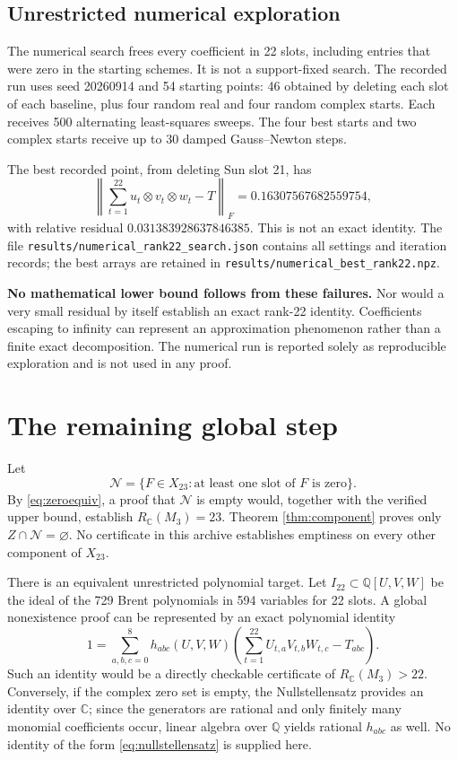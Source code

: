 \documentclass[11pt,letterpaper]{article}
\theoremstyle{definition}\newtheorem{definition}[theorem]{Definition}
\theoremstyle{remark}\newtheorem{remark}[theorem]{Remark}
\newcommand{\CC}{\mathbb C}\newcommand{\ZZ}{\mathbb Z}\newcommand{\QQ}{\mathbb Q}
\newcommand{\file}[1]{\nolinkurl{#1}}
\begin{document}
\subsection{Unrestricted numerical exploration}
The numerical search frees every coefficient in 22 slots, including
entries that were zero in the starting schemes. It is not a support-fixed
search. The recorded run uses seed 20260914 and 54 starting points:
46 obtained by deleting each slot of each baseline, plus four random real
and four random complex starts. Each receives 500 alternating
least-squares sweeps. The four best starts and two complex starts receive
up to 30 damped Gauss--Newton steps.

The best recorded point, from deleting Sun slot 21, has
\[
 \left\|\sum_{t=1}^{22}u_t\otimes v_t\otimes w_t-T\right\|_F
 =0.16307567682559754,
\]
with relative residual $0.031383928637846385$. This is not an exact
identity. The file \file{results/numerical_rank22_search.json} contains
all settings and iteration records; the best arrays are retained in
\file{results/numerical_best_rank22.npz}.

\textbf{No mathematical lower bound follows from these failures.}
Nor would a very small residual by itself establish an exact rank-22
identity. Coefficients escaping to infinity can represent an approximation
phenomenon rather than a finite exact decomposition. The numerical run is
reported solely as reproducible exploration and is not used in any proof.

\section{The remaining global step}
\label{sec:gap}
Let
\[
 \mathcal N=\{F\in X_{23}:\text{at least one slot of }F\text{ is zero}\}.
\]
By \eqref{eq:zeroequiv}, a proof that $\mathcal N$ is empty would, together
with the verified upper bound, establish $R_{\CC}(M_3)=23$.
Theorem \ref{thm:component} proves only $Z\cap\mathcal N=\varnothing$.
No certificate in this archive establishes emptiness on every other
component of $X_{23}$.

There is an equivalent unrestricted polynomial target. Let
$I_{22}\subset\QQ[U,V,W]$ be the ideal of the 729 Brent polynomials in
594 variables for 22 slots. A global nonexistence proof can be represented
by an exact polynomial identity
\begin{equation}\label{eq:nullstellensatz}
 1=\sum_{a,b,c=0}^{8}h_{abc}(U,V,W)
 \left(\sum_{t=1}^{22}U_{t,a}V_{t,b}W_{t,c}-T_{abc}\right).
\end{equation}
Such an identity would be a directly checkable certificate of
$R_{\CC}(M_3)>22$. Conversely, if the complex zero set is empty, the
Nullstellensatz provides an identity over $\CC$; since the generators
are rational and only finitely many monomial coefficients occur, linear
algebra over $\QQ$ yields rational $h_{abc}$ as well. No identity of the
form \eqref{eq:nullstellensatz} is supplied here.
\end{document}
